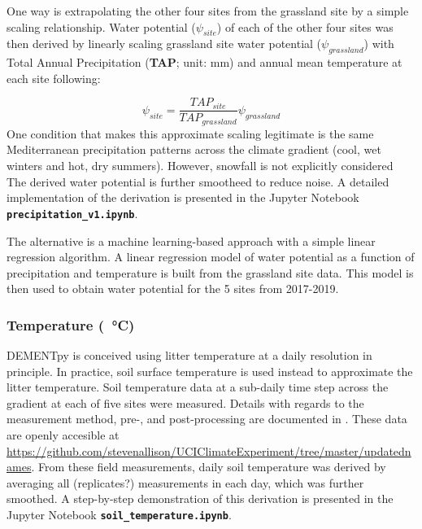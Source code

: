 \documentclass[letterpaper, 10pt]{article}
\begin{document}
One way is extrapolating the other four sites from the grassland site by a simple scaling relationship. Water potential ($\psi_{site}$) of each of the other four sites was then derived by 
 linearly scaling grassland site water potential ($\psi_{grassland}$) with Total Annual Precipitation
 (\textbf{TAP}; unit: mm) and annual mean temperature at each site following:

\begin{equation}
  \psi_{site} = \frac{TAP_{site}}{TAP_{grassland}} \psi_{grassland}
\end{equation}
One condition that makes this approximate scaling legitimate is the same Mediterranean 
precipitation patterns across the climate gradient (cool, wet winters and hot, dry summers).
However, snowfall is not explicitly considered The derived water potential is further
smootheed to reduce noise. A detailed implementation of the derivation is presented
in the Jupyter Notebook \textbf{\texttt{precipitation\_v1.ipynb}}.

The alternative is a machine learning-based approach with a simple linear regression algorithm. A linear regression model of water potential as a function of precipitation and temperature is built from the grassland site data. This model is then used to obtain water potential for the 5 sites from 2017-2019.


\subsubsection{Temperature (\SI{}{\celsius})}
DEMENTpy is conceived using litter temperature at a daily resolution in principle. 
 In practice, soil surface temperature is used instead to approximate the litter 
 temperature. Soil temperature data at a sub-daily time step across the gradient at 
 each of five sites were measured. Details with regards to the measurement method, 
 pre-, and post-processing are documented in \citet{glassman2018decomposition}. 
 These data are openly accesible at \url{https://github.com/stevenallison/UCIClimateExperiment/tree/master/updatednames}.
 From these field measurements, daily soil temperature was 
 derived by averaging all (replicates?) measurements in each day, which was further smoothed.
 A step-by-step demonstration of this derivation is presented in the Jupyter Notebook
 \textbf{\texttt{soil\_temperature.ipynb}}.
\end{document}
